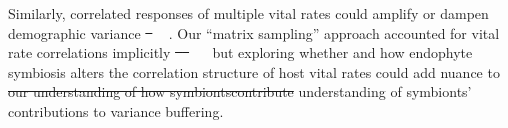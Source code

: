 \documentclass[lineno, sn-basic]{sn-jnl}%
\providecommand{\DIFadd}[1]{{\protect\color{blue}#1}} %
\providecommand{\DIFdel}[1]{{\protect\color{red}\protect\scriptsize\sout{#1}}}
\providecommand{\DIFadd}[1]{{\protect\color{blue}\uwave{#1}}} %
\providecommand{\DIFdel}[1]{{\protect\color{red}\sout{#1}}}                      %
\providecommand{\DIFaddbegin}{} %
\providecommand{\DIFaddend}{} %
\providecommand{\DIFdelbegin}{} %
\providecommand{\DIFdelend}{} %
\newcommand{\DIFscaledelfig}{0.5}
\newlength{\DIFdelgraphicswidth} %
\newlength{\DIFdelgraphicsheight} %
\newcommand{\DIFaddincludegraphics}[2][]{{\color{blue}\fbox{\DIFOincludegraphics[#1]{#2}}}} %
\newcommand{\DIFdelincludegraphics}[2][]{%
\sbox{\DIFdelgraphicsbox}{\DIFOincludegraphics[#1]{#2}}%
\settoboxwidth{\DIFdelgraphicswidth}{\DIFdelgraphicsbox} %
\settoboxtotalheight{\DIFdelgraphicsheight}{\DIFdelgraphicsbox} %
\scalebox{\DIFscaledelfig}{%
\parbox[b]{\DIFdelgraphicswidth}{\usebox{\DIFdelgraphicsbox}\\[-\baselineskip] \rule{\DIFdelgraphicswidth}{0em}}\llap{\resizebox{\DIFdelgraphicswidth}{\DIFdelgraphicsheight}{%
\setlength{\unitlength}{\DIFdelgraphicswidth}%
\begin{picture}(1,1)%
\thicklines\linethickness{2pt} %
{\color[rgb]{1,0,0}\put(0,0){\framebox(1,1){}}}%
{\color[rgb]{1,0,0}\put(0,0){\line( 1,1){1}}}%
{\color[rgb]{1,0,0}\put(0,1){\line(1,-1){1}}}%
\end{picture}%
}\hspace*{3pt}}} %
} %
\DeclareRobustCommand{\DIFaddbegin}{\DIFOaddbegin \let\includegraphics\DIFaddincludegraphics} %
\DeclareRobustCommand{\DIFaddend}{\DIFOaddend \let\includegraphics\DIFOincludegraphics} %
\DeclareRobustCommand{\DIFdelbegin}{\DIFOdelbegin \let\includegraphics\DIFdelincludegraphics} %
\DeclareRobustCommand{\DIFdelend}{\DIFOaddend \let\includegraphics\DIFOincludegraphics} %
\begin{document}
Similarly, correlated responses of multiple vital rates could amplify or dampen demographic variance \DIFdelbegin \DIFdel{\mbox{%
\cite{tuljapurkar2013population,davison2013contributions,compagnoni2016effect}}\hspace{0pt}%
}\DIFdelend \DIFaddbegin \DIFadd{\mbox{%
\citep{tuljapurkar2013population,davison2013contributions,compagnoni2016effect}}\hspace{0pt}%
}\DIFaddend . 
Our ``matrix sampling'' approach accounted for vital rate correlations implicitly \DIFdelbegin \DIFdel{\mbox{%
\cite{metcalf2015statistical} }\hspace{0pt}%
}\DIFdelend \DIFaddbegin \DIFadd{\mbox{%
\citep{metcalf2015statistical} }\hspace{0pt}%
}\DIFaddend but exploring whether and how endophyte symbiosis alters the correlation structure of host vital rates could add nuance to \DIFdelbegin \DIFdel{our understanding of how symbiontscontribute }\DIFdelend \DIFaddbegin \DIFadd{understanding of symbionts' contributions }\DIFaddend to variance buffering. 
\end{document}
